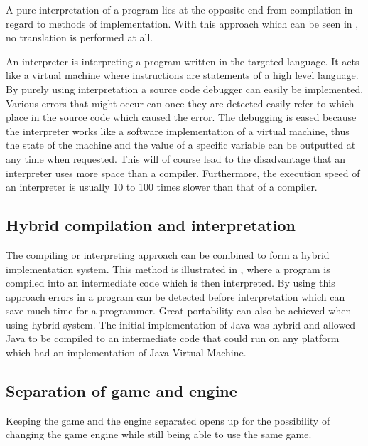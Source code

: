 A pure interpretation of a program lies at the opposite end from compilation in
regard to methods of implementation. With this approach which can be seen in
, no translation is performed at all.



An interpreter is interpreting a program written in the targeted language. It
acts like a virtual machine where instructions are statements of a high level
language. By purely using interpretation a source code debugger can easily be
implemented. Various errors that might occur can once they are detected easily
refer to which place in the source code which caused the error. The debugging is
eased because the interpreter works like a software implementation of a virtual
machine, thus the state of the machine and the value of a specific variable can
be outputted at any time when requested. This will of course lead to the
disadvantage that an interpreter uses more space than a compiler. Furthermore,
the execution speed of an interpreter is usually 10 to 100 times slower than
that of a compiler.
\cite[p. 48]{sebesta2013}

\subsection{Hybrid compilation and interpretation}
The compiling or interpreting approach can be combined to form a hybrid
implementation system. This method is illustrated in
, where a program is compiled into an
intermediate code which is then interpreted. By using this approach errors in a
program can be detected before interpretation which can save much time for a
programmer. Great portability can also be achieved when using hybrid system.
The initial implementation of Java was hybrid and allowed Java to be compiled to
an intermediate code that could run on any platform which had an implementation
of Java Virtual Machine.
\cite[p. 50]{sebesta2013}



\subsection{Separation of game and engine}
\label{subsec:engineseperation}
Keeping the game and the engine separated opens up for the possibility of
changing the game engine while still being able to use the same game. 

